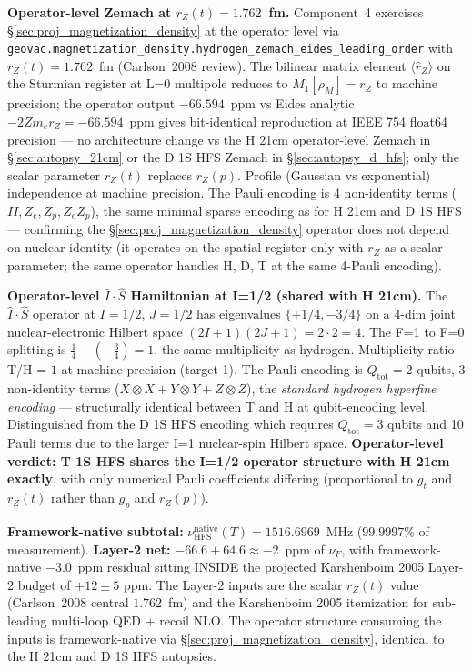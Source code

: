 \documentclass[11pt]{article}
\begin{document}
\textbf{Operator-level Zemach at $r_Z(t) = 1.762$~fm.}  Component~4
exercises \S\ref{sec:proj_magnetization_density} at the operator level
via \texttt{geovac.magnetization\_density.hydrogen\_zemach\_eides\_leading\_order}
with $r_Z(t) = 1.762$~fm (Carlson~2008 review).  The bilinear matrix
element $\langle\hat{r}_Z\rangle$ on the Sturmian register at L=0
multipole reduces to $M_1[\rho_M] = r_Z$ to machine precision; the
operator output $-66.594$~ppm vs Eides analytic $-2 Z m_e r_Z = -66.594$~ppm
gives bit-identical reproduction at IEEE 754 float64 precision --- no
architecture change vs the H 21cm operator-level Zemach in
\S\ref{sec:autopsy_21cm} or the D 1S HFS Zemach in
\S\ref{sec:autopsy_d_hfs}; only the scalar parameter $r_Z(t)$ replaces
$r_Z(p)$.  Profile (Gaussian vs exponential) independence at machine
precision.  The Pauli encoding is 4 non-identity terms
($II, Z_e, Z_p, Z_e Z_p$), the same minimal sparse encoding as for H
21cm and D 1S HFS --- confirming the
\S\ref{sec:proj_magnetization_density} operator does not depend on
nuclear identity (it operates on the spatial register only with $r_Z$
as a scalar parameter; the same operator handles H, D, T at the same
4-Pauli encoding).

\textbf{Operator-level $\hat{I}\cdot\hat{S}$ Hamiltonian at I=1/2
(shared with H 21cm).}  The $\hat{I}\cdot\hat{S}$ operator at $I=1/2$,
$J=1/2$ has eigenvalues $\{+1/4, -3/4\}$ on a 4-dim joint
nuclear-electronic Hilbert space $(2I+1)(2J+1) = 2 \cdot 2 = 4$.  The
F=1 to F=0 splitting is $\frac{1}{4} - (-\frac{3}{4}) = 1$, the same
multiplicity as hydrogen.  Multiplicity ratio T/H = $1$ at machine
precision (target 1).  The Pauli encoding is $Q_\text{tot}=2$ qubits,
3 non-identity terms ($X \otimes X + Y \otimes Y + Z \otimes Z$), the
\emph{standard hydrogen hyperfine encoding} --- structurally identical
between T and H at qubit-encoding level.  Distinguished from the D 1S
HFS encoding which requires $Q_\text{tot}=3$ qubits and 10 Pauli terms
due to the larger I=1 nuclear-spin Hilbert space.
\textbf{Operator-level verdict: T 1S HFS shares the I=1/2 operator
structure with H 21cm exactly}, with only numerical Pauli
coefficients differing (proportional to $g_t$ and $r_Z(t)$ rather than
$g_p$ and $r_Z(p)$).

\textbf{Framework-native subtotal:} $\nu_\text{HFS}^\text{native}(T) =
1516.6969$~MHz ($99.9997\%$ of measurement).  \textbf{Layer-2 net:}
$-66.6 + 64.6 \approx -2$~ppm of $\nu_F$, with framework-native
$-3.0$~ppm residual sitting INSIDE the projected Karshenboim 2005
Layer-2 budget of $+12 \pm 5$ ppm.  The Layer-2 inputs are the scalar
$r_Z(t)$ value (Carlson~2008 central $1.762$~fm) and the Karshenboim
2005 itemization for sub-leading multi-loop QED + recoil NLO.  The
operator structure consuming the inputs is framework-native via
\S\ref{sec:proj_magnetization_density}, identical to the H 21cm and
D 1S HFS autopsies.
\end{document}
